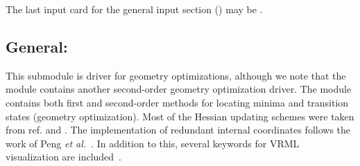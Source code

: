 The last input card for the general input section ()
may be .

\subsection{General: }\label{subsec:minimize}

This submodule is driver for geometry optimizations, although we
note that the  module contains another second-order
geometry optimization driver. The
 module contains both first and second-order methods
for locating minima and transition states (geometry optimization). Most of the Hessian
updating schemes were taken from
ref.\cite{thkrprt95} and \cite{Fletcher}. The implementation of
redundant internal coordinates
follows the work of Peng {\it et al.\/}~\cite{cppyahbsmjfjcc17}. In
addition to this, several keywords for VRML visualization are
included~\cite{VRML}.

